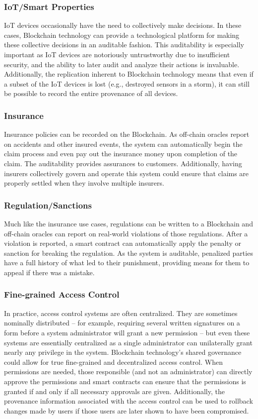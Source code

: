 \subsubsection{IoT/Smart Properties}
IoT devices occasionally have the need to collectively make decisions.
In these cases, Blockchain technology can provide a technological platform for making these collective decisions in an auditable fashion.
This auditability is especially important as IoT devices are notoriously untrustworthy due to insufficient security, and the ability to later audit and analyze their actions is invaluable.
Additionally, the replication inherent to Blockchain technology means that even if a subset of the IoT devices is lost (e.g., destroyed sensors in a storm), it can still be possible to record the entire provenance of all devices.

\subsubsection{Insurance}
Insurance policies can be recorded on the Blockchain.
As off-chain oracles report on accidents and other insured events, the system can automatically begin the claim process and even pay out the insurance money upon completion of the claim.
The auditability provides assurances to customers.
Additionally, having insurers collectively govern and operate this system could ensure that claims are properly settled when they involve multiple insurers.

\subsubsection{Regulation/Sanctions}
Much like the insurance use cases, regulations can be written to a Blockchain and off-chain oracles can report on real-world violations of those regulations.
After a violation is reported, a smart contract can automatically apply the penalty or sanction for breaking the regulation.
As the system is auditable, penalized parties have a full history of what led to their punishment, providing means for them to appeal if there was a mistake.

\subsubsection{Fine-grained Access Control}
In practice, access control systems are often centralized. They are sometimes nominally distributed -- for example, requiring several written signatures on a form before a system administrator will grant a new permission -- but even these systems are essentially centralized as a single administrator can unilaterally grant nearly any privilege in the system.
Blockchain technology's shared governance could allow for true fine-grained and decentralized access control.
When permissions are needed, those responsible (and not an administrator) can directly approve the permissions and smart contracts can ensure that the permissions is granted if and only if all necessary approvals are given.
Additionally, the provenance information associated with the access control can be used to rollback changes made by users if those users are later shown to have been compromised.

